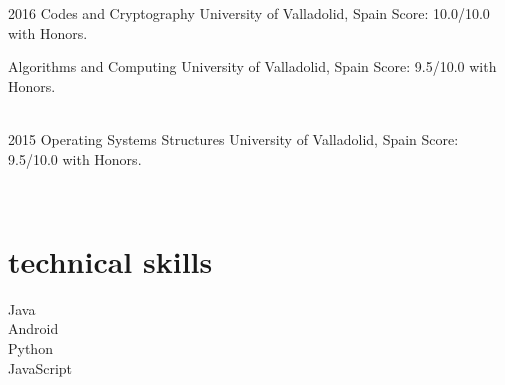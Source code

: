 \documentclass[]{friggeri-cv} %
\begin{document}
\begin{entrylist}


\entry
{2016}
{Codes and Cryptography}
{University of Valladolid, Spain}
{Score: 10.0/10.0 with Honors.}

\entry
{}
{Algorithms and Computing}
{University of Valladolid, Spain}
{Score: 9.5/10.0 with Honors.}

\\
\entry
{2015}
{Operating Systems Structures}
{University of Valladolid, Spain}
{Score: 9.5/10.0 with Honors.}


\end{entrylist}
\\
\noindent\begin{minipage}[t]{0.5\linewidth}


\section{technical skills}
\hfill
\begin{flushright}

Java\quad{\color{red} $\varheartsuit\varheartsuit\varheartsuit\varheartsuit\varheartsuit\varheartsuit\varheartsuit\varheartsuit\varheartsuit\varheartsuit\varheartsuit\varheartsuit\varheartsuit\varheartsuit$}{\color{black} $\varheartsuit$} \\

Android\quad{\color{red} $\varheartsuit\varheartsuit\varheartsuit\varheartsuit\varheartsuit\varheartsuit\varheartsuit\varheartsuit\varheartsuit\varheartsuit\varheartsuit\varheartsuit$}{\color{black} $\varheartsuit\varheartsuit\varheartsuit$} \\

Python\quad{\color{red} $\varheartsuit\varheartsuit\varheartsuit\varheartsuit\varheartsuit\varheartsuit\varheartsuit\varheartsuit\varheartsuit$}{\color{black} $\varheartsuit\varheartsuit\varheartsuit\varheartsuit\varheartsuit\varheartsuit$} \\

JavaScript\quad{\color{red} $\varheartsuit\varheartsuit\varheartsuit\varheartsuit\varheartsuit\varheartsuit\varheartsuit$}{\color{black} $\varheartsuit\varheartsuit\varheartsuit\varheartsuit\varheartsuit\varheartsuit\varheartsuit\varheartsuit$} \\


\end{flushright}
\end{minipage}
\end{document}
